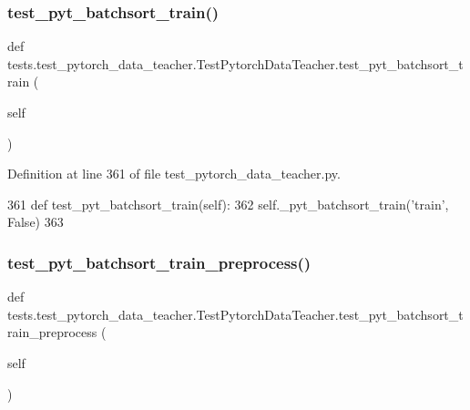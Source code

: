 \subsubsection{\texorpdfstring{test\+\_\+pyt\+\_\+batchsort\+\_\+train()}{test\_pyt\_batchsort\_train()}}
{\footnotesize\ttfamily def tests.\+test\+\_\+pytorch\+\_\+data\+\_\+teacher.\+Test\+Pytorch\+Data\+Teacher.\+test\+\_\+pyt\+\_\+batchsort\+\_\+train (\begin{DoxyParamCaption}\item[{}]{self }\end{DoxyParamCaption})}



Definition at line 361 of file test\+\_\+pytorch\+\_\+data\+\_\+teacher.\+py.


\begin{DoxyCode}
361     \textcolor{keyword}{def }test\_pyt\_batchsort\_train(self):
362         self.\_pyt\_batchsort\_train(\textcolor{stringliteral}{'train'}, \textcolor{keyword}{False})
363 
\end{DoxyCode}
\mbox{\label{classtests_1_1test__pytorch__data__teacher_1_1TestPytorchDataTeacher_acf2428b3226bc0cf95d4dbb80877e6d0}} 
\subsubsection{\texorpdfstring{test\+\_\+pyt\+\_\+batchsort\+\_\+train\+\_\+preprocess()}{test\_pyt\_batchsort\_train\_preprocess()}}
{\footnotesize\ttfamily def tests.\+test\+\_\+pytorch\+\_\+data\+\_\+teacher.\+Test\+Pytorch\+Data\+Teacher.\+test\+\_\+pyt\+\_\+batchsort\+\_\+train\+\_\+preprocess (\begin{DoxyParamCaption}\item[{}]{self }\end{DoxyParamCaption})}



